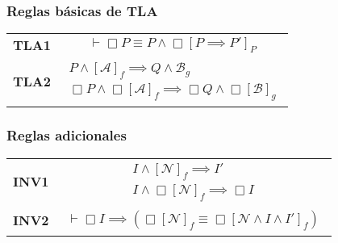 \subsubsection{Reglas básicas de TLA}
\begin{tabular}{ll}
    \textbf{TLA1} & 
    \begin{minipage}{0.5\linewidth}
    \begin{equation*}
        \vdash \Box P \equiv P \land \Box[P \implies P']_P
    \end{equation*}
    \end{minipage} \\[10pt]
    \textbf{TLA2} & 
    \begin{minipage}{0.5\linewidth}
    \begin{equation*}
    \begin{array}{c}
        P \land [\mathcal{A}]_f \implies Q \land \mathcal{B}_g \\
        \hline
        \Box P \land \Box [\mathcal{A}]_f \implies \Box Q \land \Box[\mathcal{B}]_g
    \end{array}
    \end{equation*}
    \end{minipage}
\end{tabular}

\subsubsection{Reglas adicionales}
\begin{tabular}{ll}
    \textbf{INV1} & 
    \begin{minipage}{0.5\linewidth}
    \begin{equation*}
    \begin{array}{c}
        I \land [\mathcal{N}]_f \implies I' \\
        \hline
        I \land \Box [\mathcal{N}]_f \implies \Box I
    \end{array}
    \end{equation*}
    \end{minipage} \\[10pt]
    \textbf{INV2} & 
    \begin{minipage}{0.5\linewidth}
    \begin{equation*}
    \begin{array}{c}
        \vdash \Box I \implies (\Box[\mathcal{N}]_f \equiv \Box [\mathcal{N} \land I \land I']_f)
    \end{array}
    \end{equation*}
    \end{minipage}
\end{tabular}

